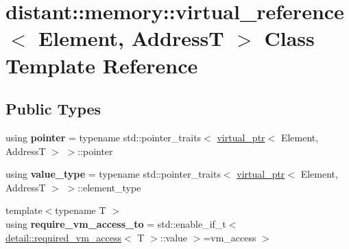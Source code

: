 \hypertarget{classdistant_1_1memory_1_1virtual__reference}{}\section{distant\+:\+:memory\+:\+:virtual\+\_\+reference$<$ Element, AddressT $>$ Class Template Reference}
\label{classdistant_1_1memory_1_1virtual__reference}
\subsection*{Public Types}
\begin{DoxyCompactItemize}
\item 
\mbox{\label{classdistant_1_1memory_1_1virtual__reference_a090a34daa4d50c65e1f55da5b112c62b}} 
using {\bfseries pointer} = typename std\+::pointer\+\_\+traits$<$ \mbox{\hyperlink{classdistant_1_1memory_1_1virtual__ptr}{virtual\+\_\+ptr}}$<$ Element, AddressT $>$ $>$\+::pointer
\item 
\mbox{\label{classdistant_1_1memory_1_1virtual__reference_ad4e7bbf25b6c72240c08e08b11060c68}} 
using {\bfseries value\+\_\+type} = typename std\+::pointer\+\_\+traits$<$ \mbox{\hyperlink{classdistant_1_1memory_1_1virtual__ptr}{virtual\+\_\+ptr}}$<$ Element, AddressT $>$ $>$\+::element\+\_\+type
\item 
\mbox{\label{classdistant_1_1memory_1_1virtual__reference_a43d4fc28c6ec679068ffd5163d6ee947}} 
{\footnotesize template$<$typename T $>$ }\\using {\bfseries require\+\_\+vm\+\_\+access\+\_\+to} = std\+::enable\+\_\+if\+\_\+t$<$ \mbox{\hyperlink{structdistant_1_1memory_1_1detail_1_1required__vm__access}{detail\+::required\+\_\+vm\+\_\+access}}$<$ T $>$\+::value $>$=vm\+\_\+access $>$
\end{DoxyCompactItemize}
